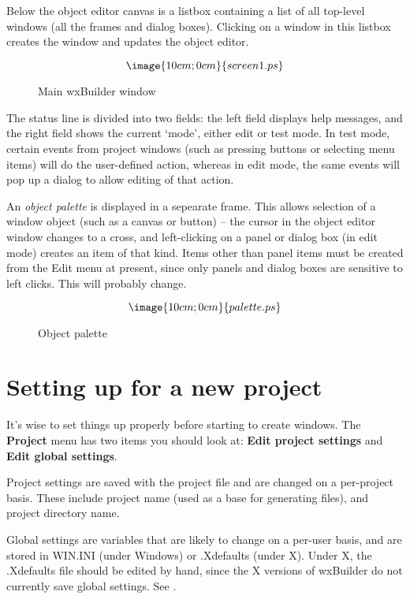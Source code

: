 Below the object editor canvas is a listbox containing a list of all
top-level windows (all the frames and dialog boxes). Clicking on a
window in this listbox creates the window and updates the object editor.

\begin{figure}
$$\image{10cm;0cm}{screen1.ps}$$
\caption{Main wxBuilder window}\label{mainwin}
\end{figure}

The status line is divided into two fields: the left field displays help
messages, and the right field shows the current `mode', either edit or
test mode. In test mode, certain events from project windows (such as
pressing buttons or selecting menu items) will do the user-defined action,
whereas in edit mode, the same events will pop up a dialog to allow editing
of that action.

An {\it object palette} is displayed in a sepearate frame. This allows
selection of a window object (such as a canvas or button) -- the cursor in the object
editor window changes to a cross, and left-clicking on a panel or dialog box
(in edit mode) creates an item of that kind. Items other than panel items
must be created from the Edit menu at present, since only panels and dialog
boxes are sensitive to left clicks. This will probably change.

\begin{figure}
$$\image{10cm;0cm}{palette.ps}$$
\caption{Object palette}\label{pallete}
\end{figure}

\section{Setting up for a new project}

It's wise to set things up properly before starting to create windows.
The {\bf Project} menu has two items you should look at: {\bf Edit project
settings} and {\bf Edit global settings}.

Project settings are saved with the project file and are changed on a
per-project basis. These include project name (used as a base for
generating files), and project directory name.

Global settings are variables that are likely to change on a per-user
basis, and are stored in WIN.INI (under Windows) or .Xdefaults (under
X). Under X, the .Xdefaults file should be edited by hand, since the X
versions of wxBuilder do not currently save global settings. See\rtfsp
{}.

